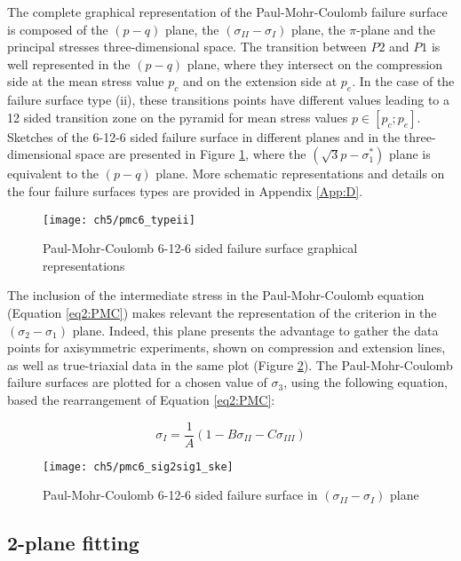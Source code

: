 The complete graphical representation of the Paul-Mohr-Coulomb failure surface is composed of the $(p-q)$ plane, the $(\sigma_{II}-\sigma_{I})$ plane, the $\pi$-plane and the principal stresses three-dimensional space. The transition between $P2$ and $P1$ is well represented in the $(p-q)$ plane, where they intersect on the compression side at the mean stress value $p_c$ and on the extension side at $p_e$. In the case of the failure surface type (ii), these transitions points have different values leading to a 12 sided transition zone on the pyramid for mean stress values $p \in \left[p_c;p_e\right]$. Sketches of the 6-12-6 sided failure surface in different planes and in the three-dimensional space are presented in Figure \ref{fig5:6pmc_typeii}, where the $(\sqrt{3}p-\sigma_{1}^*)$ plane is equivalent to the $(p-q)$ plane. More schematic representations and details on the four failure surfaces types are provided in Appendix \ref{App:D}.

\begin{figure}
    \centering
    \texttt{[image: ch5/pmc6\_typeii]}
    \caption{Paul-Mohr-Coulomb 6-12-6 sided failure surface graphical representations}
    \label{fig5:6pmc_typeii}
\end{figure}

The inclusion of the intermediate stress in the Paul-Mohr-Coulomb equation (Equation \ref{eq2:PMC}) makes relevant the representation of the criterion in the $(\sigma_2-\sigma_1)$ plane. Indeed, this plane presents the advantage to gather the data points for axisymmetric experiments, shown on compression and extension lines, as well as true-triaxial data in the same plot (Figure \ref{fig5:6pmc_sig2sig1}). The Paul-Mohr-Coulomb failure surfaces are plotted for a chosen value of $\sigma_3$, using the following equation, based the rearrangement of Equation \ref{eq2:PMC}:

\begin{equation}\label{eq5:pmc_sig2sig1}
    \sigma_I = \frac{1}{A}\left(1-B\sigma_{II}-C\sigma_{III}\right)
\end{equation}
\begin{figure}
    \centering
    \texttt{[image: ch5/pmc6\_sig2sig1\_ske]}
    \caption{Paul-Mohr-Coulomb 6-12-6 sided failure surface in $(\sigma_{II}-\sigma_{I})$ plane}
    \label{fig5:6pmc_sig2sig1}
\end{figure}

\subsection{2-plane fitting}\label{ch5:algo}

